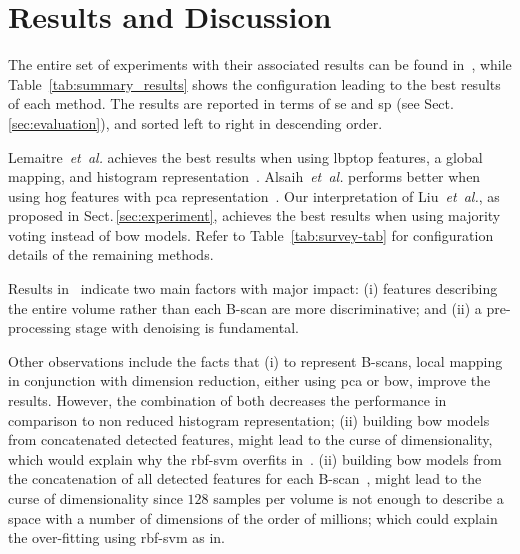 \section{Results and Discussion}\label{sec:results}\label{sec:discussion}

The entire set of experiments with their associated results can be found in~\cite{rethinopaty20016apr-repoICPR}, while Table~\ref{tab:summary_results} shows the configuration leading to the best results of each method.
The results are reported in terms of \gls{se} and \gls{sp} (see Sect.\,\ref{sec:evaluation}), and sorted left to right in descending order.

Lemaitre~\emph{et~al.} achieves the best results when using \gls{lbptop} features, a global mapping, and histogram representation~\cite{Lemaintre2015miccaiOCT}.
Alsaih~\emph{et~al.} performs better when using \gls{hog} features with \gls{pca} representation~\cite{Alsaih2016apr-repoICPR}.
Our interpretation of Liu~\emph{et~al.}, as proposed in Sect.\,\ref{sec:experiment}, achieves the best results when using majority voting instead of \gls{bow} models.
Refer to Table~\ref{tab:survey-tab} for configuration details of the remaining methods.

Results in~\cite{rethinopaty20016apr-repoICPR} indicate two main factors with major impact:
(i) features describing the entire volume rather than each B-scan are more discriminative; and
(ii) a pre-processing stage with denoising is fundamental.

Other observations include the facts that
(i) to represent B-scans, local mapping in conjunction with dimension reduction, either using \gls{pca} or \gls{bow}, improve the results.
However, the combination of both decreases the performance in comparison to non reduced histogram representation;
(ii) building \gls{bow} models from concatenated detected features, might lead to the curse of dimensionality, which would explain why the \gls{rbf}-\gls{svm} overfits in~\cite{liu20016apr-repoICPR}.
(ii) building \gls{bow} models from the concatenation of all detected features for each B-scan~\cite{liu20016apr-repoICPR}, might lead to the curse of dimensionality since $128$ samples per volume is not enough to describe a space with a number of dimensions of the order of millions; which could explain the over-fitting using \gls{rbf}-\gls{svm} as in.
